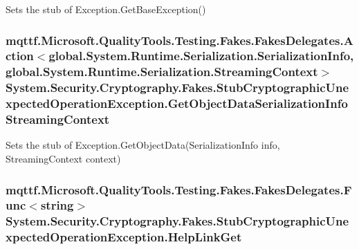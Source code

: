Sets the stub of Exception.\-Get\-Base\-Exception()

\hypertarget{class_system_1_1_security_1_1_cryptography_1_1_fakes_1_1_stub_cryptographic_unexpected_operation_exception_a1519ce0c60dac6dc7bb3cb74725e88c8}{
\subsubsection[{Get\-Object\-Data\-Serialization\-Info\-Streaming\-Context}]{\setlength{\rightskip}{0pt plus 5cm}mqttf.\-Microsoft.\-Quality\-Tools.\-Testing.\-Fakes.\-Fakes\-Delegates.\-Action$<$global.\-System.\-Runtime.\-Serialization.\-Serialization\-Info, global.\-System.\-Runtime.\-Serialization.\-Streaming\-Context$>$ System.\-Security.\-Cryptography.\-Fakes.\-Stub\-Cryptographic\-Unexpected\-Operation\-Exception.\-Get\-Object\-Data\-Serialization\-Info\-Streaming\-Context}}\label{class_system_1_1_security_1_1_cryptography_1_1_fakes_1_1_stub_cryptographic_unexpected_operation_exception_a1519ce0c60dac6dc7bb3cb74725e88c8}


Sets the stub of Exception.\-Get\-Object\-Data(\-Serialization\-Info info, Streaming\-Context context)

\hypertarget{class_system_1_1_security_1_1_cryptography_1_1_fakes_1_1_stub_cryptographic_unexpected_operation_exception_ad855202896c9c65d02fb7c9b543957d8}{
\subsubsection[{Help\-Link\-Get}]{\setlength{\rightskip}{0pt plus 5cm}mqttf.\-Microsoft.\-Quality\-Tools.\-Testing.\-Fakes.\-Fakes\-Delegates.\-Func$<$string$>$ System.\-Security.\-Cryptography.\-Fakes.\-Stub\-Cryptographic\-Unexpected\-Operation\-Exception.\-Help\-Link\-Get}}\label{class_system_1_1_security_1_1_cryptography_1_1_fakes_1_1_stub_cryptographic_unexpected_operation_exception_ad855202896c9c65d02fb7c9b543957d8}


